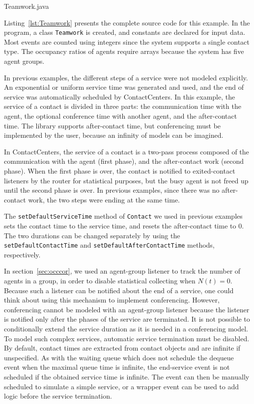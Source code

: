 

{Teamwork.java}

Listing~\ref{lst:Teamwork} presents the complete source code for this
example.  In the program,
a class \texttt{Teamwork} is
created, and constants are declared for input data.  Most events are
counted using integers since the system supports a single contact
type.  The occupancy ratios of agents require arrays because the system
has five agent groups.

In previous examples, the different steps of a service were not
modeled explicitly.
An exponential or uniform service time was generated and
used, and the end of service was automatically scheduled by
ContactCenters.  In this example, the service of a contact is divided
in three
parts: the communication time with the
agent, the optional conference time with another agent, and the
after-contact
time.  The library supports after-contact time, but
conferencing must
be implemented by the user, because an infinity of
models can be imagined.

In ContactCenters, the service of a contact
is a two-pass process composed of the
communication with the agent (first phase), and the after-contact work
(second phase).
When the first phase is over, the contact is notified to
exited-contact listeners by the router for statistical purposes, but
the busy agent is not freed up until the second phase is over.
In previous examples, since there was no after-contact work, the two
steps were ending at the same time.

The \texttt{set\-Default\-Service\-Time} method of \texttt{Contact} we used in
previous examples sets the contact
time to the service time, and resets the after-contact time to 0.
The two durations can be changed separately by using the
\texttt{set\-Default\-Contact\-Time} and
\texttt{set\-Default\-After\-Contact\-Time} methods,
respectively.

In section~\ref{sec:occcor}, we used an agent-group listener to track
the number of agents in a group, in order to disable statistical
collecting when $N(t)=0$.  Because such a listener can be notified
about the end of a service, one could think about using this mechanism
to implement conferencing.
However, conferencing cannot be modeled with an agent-group listener
because
the listener is notified only after the phases of the
service are terminated.
It is not possible to conditionally extend the service duration as it
is needed in a conferencing model.
To model such complex services, automatic service termination must be
disabled.  By default, contact times are extracted from contact
objects and are infinite if unspecified.
As with the waiting queue which does not
schedule the dequeue event when the maximal queue time is infinite,
the end-service event is not scheduled if the obtained service time is
infinite.  The event can then be manually scheduled to simulate a
simple
service, or a wrapper event can be used to add logic before the
service termination.

